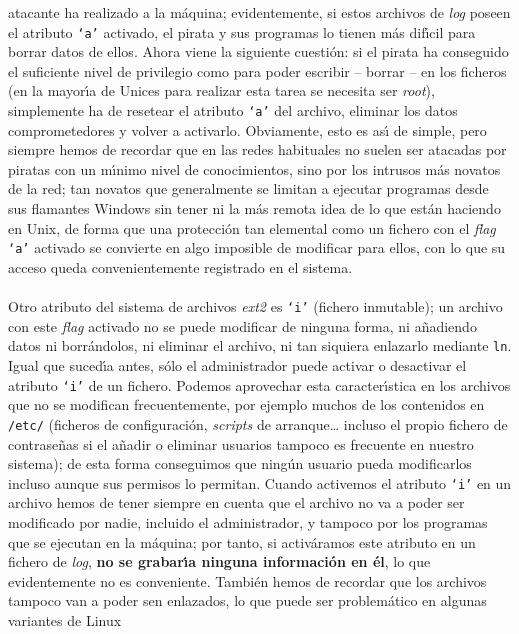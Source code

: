 atacante ha realizado a la m\'aquina; evidentemente, si estos archivos de {\it
log} poseen el atributo {\tt `a'} activado, el pirata y sus programas lo tienen 
m\'as dif\'{\i}cil para borrar datos de ellos. Ahora viene la siguiente
cuesti\'on: si el pirata ha conseguido el suficiente nivel de privilegio como
para poder escribir -- borrar -- en los ficheros (en la mayor\'{\i}a de Unices
para realizar esta tarea se necesita ser {\it root}), simplemente ha de 
resetear el atributo {\tt `a'} del archivo, eliminar los datos comprometedores
y volver a activarlo. Obviamente, esto es as\'{\i} de simple, pero siempre 
hemos de recordar que en las redes habituales no suelen ser atacadas por piratas
con un m\'{\i}nimo nivel de conocimientos, sino por los intrusos m\'as novatos
de la red; tan novatos que generalmente se limitan a ejecutar programas desde 
sus flamantes Windows sin tener ni la m\'as remota idea de lo que 
est\'an haciendo en Unix, de forma que una protecci\'on tan elemental como un 
fichero con el {\it flag} {\tt `a'} activado se convierte en algo imposible de 
modificar para ellos, con lo que su acceso queda convenientemente registrado en 
el sistema.\\
\\Otro atributo del sistema de archivos {\it ext2} es {\tt `i'} (fichero 
inmutable); un archivo con este {\it flag} activado no se puede modificar de
ninguna forma, ni a\~nadiendo datos ni borr\'andolos, ni eliminar el archivo,
ni tan siquiera enlazarlo mediante {\tt ln}. Igual que suced\'{\i}a antes,
s\'olo el administrador puede activar o desactivar el atributo {\tt `i'} de
un fichero. Podemos aprovechar esta caracter\'{\i}stica en los archivos que 
no se modifican frecuentemente, por ejemplo muchos de los contenidos en 
{\tt /etc/} (ficheros de configuraci\'on, {\it scripts} de arranque\ldots
incluso el propio fichero de contrase\~nas si el a\~nadir o eliminar usuarios
tampoco es frecuente en nuestro sistema); de esta forma conseguimos que 
ning\'un usuario pueda modificarlos incluso aunque sus permisos lo permitan.
Cuando activemos el atributo {\tt `i'} en un archivo hemos de tener siempre
en cuenta que el archivo no va a poder ser modificado por nadie, incluido el
administrador, y tampoco por los programas que se ejecutan en la m\'aquina;
por tanto, si activ\'aramos este atributo en un fichero de {\it log}, {\bf no
se grabar\'{\i}a ninguna informaci\'on en \'el}, lo que evidentemente no es
conveniente. Tambi\'en hemos de recordar que los archivos tampoco van a poder
sen enlazados, lo que puede ser problem\'atico en algunas variantes de Linux
